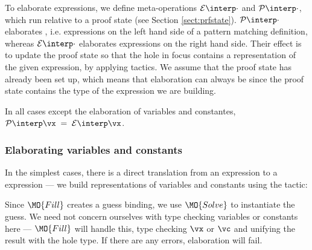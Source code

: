 

To elaborate expressions, we define meta-operations $\ttinterp{\cdot}$ and
$\ttpinterp{\cdot}$, which run relative to a proof state (see Section
\ref{sect:prfstate}). $\ttpinterp{\cdot}$ elaborates , i.e.
expressions on the left hand side of a pattern matching definition, whereas
$\ttinterp{\cdot}$ elaborates expressions on the right hand side.
Their effect is
to update the proof state so that the hole in focus contains a representation
of the given expression, by applying tactics. We assume that the proof state
has already been set up, which means that elaboration can always be
 since the proof state contains the type of the expression we
are building.

In all cases except the elaboration of variables and constantes, 
$\ttpinterp{\vx}\;=\;\ttinterp{\vx}$.

\subsubsection{Elaborating variables and constants}

In the simplest cases, there is a direct translation from an \IdrisM{} expression to
a \TT{} expression --- we build \TT{} representations of variables and constants using
the  tactic:


Since $\MO{Fill}$ creates a guess binding, we use $\MO{Solve}$ to instantiate
the guess.  We need not concern ourselves with type checking variables or
constants here --- $\MO{Fill}$ will handle this, type checking $\vx$ or $\vc$
and unifying the result with the hole type. If there are any errors,
elaboration will fail.

